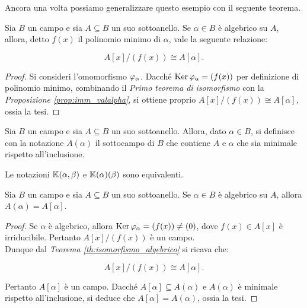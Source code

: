 \documentclass[11pt]{scrbook}
\begin{document}
Ancora una volta possiamo generalizzare questo esempio con il
seguente teorema.

\begin{theorem}
    \label{th:isomorfismo_algebrico}
    Sia $B$ un campo e sia $A \subseteq B$ un suo sottoanello.
    Se $\alpha \in B$ è algebrico su $A$, allora, detto
    $f(x)$ il polinomio minimo di $\alpha$, vale
    la seguente relazione:

    \[ A[x]/(f(x)) \cong A[\alpha]. \]

\end{theorem}

\begin{proof}
    Si consideri l'omomorfismo $\varphi_\alpha$. Dacché $\operatorname{Ker} \varphi_\alpha
        = (f(x))$ per definizione di polinomio minimo, combinando
    il \textit{Primo teorema di isomorfismo} con la
    \textit{Proposizione \ref{prop:imm_valalpha}}, si ottiene
    proprio $A[x]/(f(x)) \cong A[\alpha]$, ossia la tesi.
\end{proof}

\begin{definition}
    Sia $B$ un campo e sia $A \subseteq B$ un suo sottoanello. Allora,
    dato $\alpha \in B$,
    si definisce con la notazione $A(\alpha)$ il
    sottocampo di $B$ che contiene $A$ e $\alpha$ che
    sia minimale rispetto all'inclusione.
\end{definition}

\begin{remark*}
    Le notazioni $\mathbb{K}(\alpha, \beta)$ e $\mathbb{K}(\alpha)(\beta)$ sono equivalenti.
\end{remark*}

\begin{proposition}
    Sia $B$ un campo e sia $A \subseteq B$ un suo sottoanello.
    Se $\alpha \in B$ è algebrico su $A$, allora $A(\alpha)=A[\alpha]$.
\end{proposition}

\begin{proof}
    Se $\alpha$ è algebrico, allora $\operatorname{Ker} \varphi_\alpha = (f(x)) \neq (0)$,
    dove $f(x) \in A[x]$ è irriducibile. Pertanto $A[x]/(f(x))$ è un campo. \\

    Dunque dal \textit{Teorema \ref{th:isomorfismo_algebrico}} si
    ricava che:

    \[ A[x]/(f(x)) \cong A[\alpha]. \]

    \vskip 0.1in

    Pertanto $A[\alpha]$ è un campo. Dacché $A[\alpha] \subseteq A(\alpha)$ e $A(\alpha)$ è minimale rispetto all'inclusione,
    si deduce che $A[\alpha]=A(\alpha)$, ossia la tesi.
\end{proof}
\end{document}
